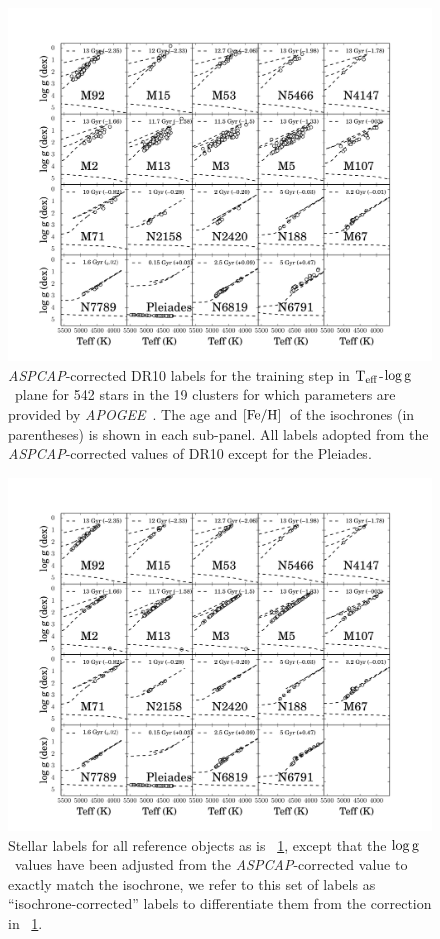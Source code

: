 \documentclass[12pt, preprint]{aastex}
\newcommand{\apogee}{\textsl{APOGEE}}
\newcommand{\aspcap}{\textsl{ASPCAP}}
\newcommand{\teff}{\mbox{$\rm T_{eff}$}}
\newcommand{\feh}{\mbox{$\rm [Fe/H]$}}
\newcommand{\logg}{\mbox{$\rm \log g$}}
\begin{document}
\begin{figure}[h!]
\centering
    \includegraphics[scale=0.31]{./plots/training_aspcap2.pdf}
\caption{\aspcap-corrected DR10 labels  for the training step in \teff-\logg\ plane for 542 stars in the 19 clusters for which parameters are provided by \apogee\ \citep{Meszaros2013}. The age and \feh\ of the isochrones (in parentheses) is shown in each sub-panel. All labels adopted from the \aspcap-corrected values of DR10 except for the Pleiades. }
\label{fig:trainingaspcap}
\end{figure}

\begin{figure}[h!]
\centering
  \includegraphics[scale=0.31]{./plots/training_mkn2.pdf}
\caption{Stellar labels for all reference objects as is \figurename~\ref{fig:trainingaspcap}, except that the \logg\ values have been adjusted from the \aspcap-corrected value to exactly match the isochrone, we refer to this set of labels as  ``isochrone-corrected'' labels to differentiate them from the correction in \figurename~\ref{fig:trainingaspcap}.  }
\label{fig:trainingisochrone}
\end{figure}
\end{document}
